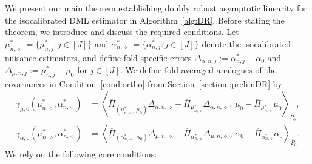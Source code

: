 \documentclass[11pt]{article}
\theoremstyle{plain}
\begin{document}
We present our main theorem establishing doubly robust asymptotic linearity
for the isocalibrated DML estimator in Algorithm~\ref{alg:DR}. Before stating
the theorem, we introduce and discuss the required conditions. Let
$\mu_{n,\diamond}^* := \{\mu_{n,j}^*: j \in [J]\}$ and
$\alpha_{n,\diamond}^* := \{\alpha_{n,j}^*: j \in [J]\}$ denote the isocalibrated
nuisance estimators, and define fold-specific errors
$\Delta_{\alpha,n,j} := \alpha_{n,j}^* - \alpha_0$ and
$\Delta_{\mu,n,j} := \mu_{n,j}^* - \mu_0$ for $j \in [J]$. We define fold-averaged analogues of the
covariances in  Condition~\ref{cond:ortho} from
Section~\ref{section::prelimDR} by
\begin{align*}
    \overline{\gamma}_{\mu,0}(\mu_{n, \diamond}^*, \alpha_{n, \diamond}^*)
    &=
    \left\langle
    \overline{\Pi}_{(\mu_{n,\diamond}^*,\, \mu_0)}\Delta_{\alpha,n,\diamond}
    - \overline{\Pi}_{\mu_{n,\diamond}^*}\Delta_{\alpha,n,\diamond}
    \,,\,
    \mu_0 - \overline{\Pi}_{\mu_{n,\diamond}^*}\mu_0
    \right\rangle_{\overline{P}_0}
     ,\\
    \overline{\gamma}_{\alpha,0}(\mu_{n, \diamond}^*, \alpha_{n, \diamond}^*)
    &=
    \left\langle
    \overline{\Pi}_{(\alpha_{n,\diamond}^*,\, \alpha_0)}\Delta_{\mu,n,\diamond}
    - \overline{\Pi}_{\alpha_{n,\diamond}^*}\Delta_{\mu,n,\diamond}
    \,,\,
    \alpha_0 - \overline{\Pi}_{\alpha_{n,\diamond}^*}\alpha_0
    \right\rangle_{\overline{P}_0}.
\end{align*}
We rely on the following core
conditions:


 
\end{document}
